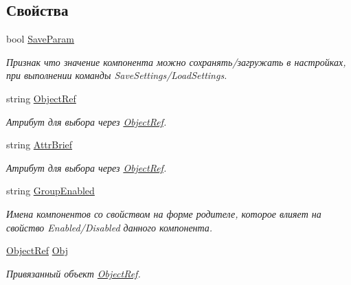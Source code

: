 \subsection*{Свойства}
\begin{DoxyCompactItemize}
\item 
bool \mbox{\hyperlink{class_f_b_a_1_1_panel_f_b_a_a010c5cb9807f94ae4bfb73ab49c9cb11}{Save\+Param}}
\begin{DoxyCompactList}\small\item\em Признак что значение компонента можно сохранять/загружать в настройках, при выполнении команды Save\+Settings/\+Load\+Settings. ~\newline
\end{DoxyCompactList}\item 
string \mbox{\hyperlink{class_f_b_a_1_1_panel_f_b_a_aa2095cd6b2a47d1564cdb92987f9c4e7}{Object\+Ref}}
\begin{DoxyCompactList}\small\item\em Атрибут для выбора через \mbox{\hyperlink{class_f_b_a_1_1_object_ref}{Object\+Ref}}. ~\newline
\end{DoxyCompactList}\item 
string \mbox{\hyperlink{class_f_b_a_1_1_panel_f_b_a_a23edcf7c4c61f67375160cddde67eeb4}{Attr\+Brief}}
\begin{DoxyCompactList}\small\item\em Атрибут для выбора через \mbox{\hyperlink{class_f_b_a_1_1_object_ref}{Object\+Ref}}. ~\newline
\end{DoxyCompactList}\item 
string \mbox{\hyperlink{class_f_b_a_1_1_panel_f_b_a_aed9278b2e094c475304961c1ff4194ef}{Group\+Enabled}}
\begin{DoxyCompactList}\small\item\em Имена компонентов со свойством на форме родителе, которое влияет на свойство Enabled/\+Disabled данного компонента. ~\newline
\end{DoxyCompactList}\item 
\mbox{\hyperlink{class_f_b_a_1_1_object_ref}{Object\+Ref}} \mbox{\hyperlink{class_f_b_a_1_1_panel_f_b_a_a7ad5a02284e18f39585c13da75f624f8}{Obj}}
\begin{DoxyCompactList}\small\item\em Привязанный объект \mbox{\hyperlink{class_f_b_a_1_1_object_ref}{Object\+Ref}}. \end{DoxyCompactList}\end{DoxyCompactItemize}


